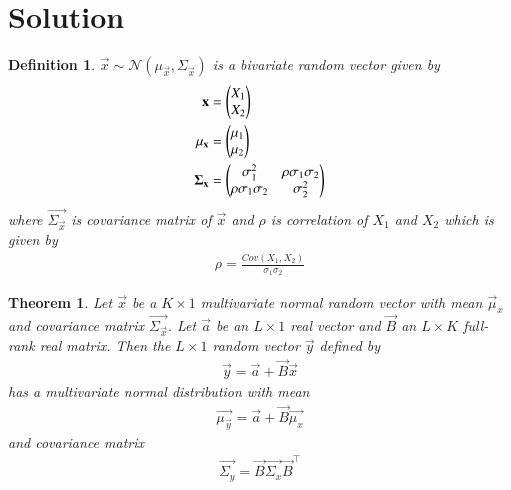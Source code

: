 \documentclass[journal,12pt,twocolumn]{IEEEtran}
\newtheorem{theorem}{Theorem}[section]
\newtheorem{definition}{Definition}[section]
\begin{document}
\section*{Solution}
\begin{definition}
    $\vec{x}\sim\mathcal{N}(\mu_{\vec{x}},\Sigma_{\vec{x}})$ is a bivariate random vector given by
    \begin{align}
        \mathbf{x}&=\begin{pmatrix}X_1\\
                       X_2\end{pmatrix}\\
        \mathbf{\mu_{\mathbf{x}}}&=\begin{pmatrix}\mu_1\\
                                    \mu_2\end{pmatrix}\\
        \mathbf{\Sigma_{\mathbf{x}}}&=\begin{pmatrix}\sigma_1^2&\rho\sigma_1\sigma_2\\
                                        \rho\sigma_1\sigma_2&\sigma_2^2\end{pmatrix}
    \end{align}
    where $\vec{\Sigma_{\vec{x}}}$ is covariance matrix of $\vec{x}$ and $\rho$ is correlation of $X_1$ and $X_2$ which is given by
    \begin{align}
        \rho=\frac{Cov(X_1,X_2)}{\sigma_1\sigma_2}
    \end{align}
\end{definition}
\begin{theorem}
     Let $\vec{x}$ be a $K\times1$ multivariate normal random vector with mean $\vec{\mu}_x$ and covariance matrix $\vec{\Sigma_{\vec{x}}}$. Let $\vec{a}$ be an $L\times1$ real vector and $\vec{B}$ an $L\times K$ full-rank real matrix. Then the $L\times1$ random vector $\vec{y}$ defined by
     \begin{align}
         \vec{y}=\vec{a}+\vec{B}\vec{x}
     \end{align}
     has a multivariate normal distribution with mean
     \begin{align}
         \vec{\mu_\vec{y}}=\vec{a}+\vec{B}\vec{\mu_x}
     \end{align}
     and covariance matrix
     \begin{align}
         \vec{\Sigma_y}=\vec{B}\vec{\Sigma_x}\vec{B}^{\top}
     \end{align}
\end{theorem}
\end{document}
